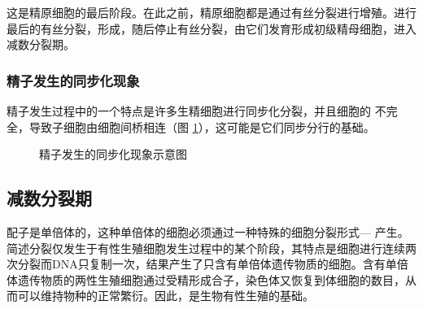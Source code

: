 这是精原细胞的最后阶段。在此之前，精原细胞都是通过有丝分裂进行增殖。进行最后的有丝分裂，形成，随后停止有丝分裂，由它们发育形成初级精母细胞，进入减数分裂期。

\subsubsection{精子发生的同步化现象}

精子发生过程中的一个特点是许多生精细胞进行同步化分裂，并且细胞的
不完全，导致子细胞由细胞间桥相连（图 \ref{figure_spermatogenesis_synchronization}），这可能是它们同步分行的基础。

\begin{figure}
\centering
\myFigurePlaceholder
\caption{精子发生的同步化现象示意图}
\label{figure_spermatogenesis_synchronization}
\end{figure}

\subsection{减数分裂期}

配子是单倍体的，这种单倍体的细胞必须通过一种特殊的细胞分裂形式---
产生。简述分裂仅发生于有性生殖细胞发生过程中的某个阶段，其特点是细胞进行连续两次分裂而DNA只复制一次，结果产生了只含有单倍体遗传物质的细胞。含有单倍体遗传物质的两性生殖细胞通过受精形成合子，染色体又恢复到体细胞的数目，从而可以维持物种的正常繁衍。因此，是生物有性生殖的基础。


